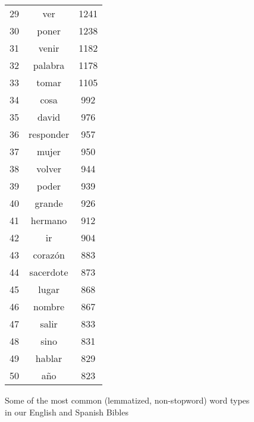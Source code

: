 \begin{figure*}
\begin{tiny}
\begin{centering}
\begin{tabular}{|r|c|c|}
29 & ver & 1241 \\
30 & poner & 1238 \\
31 & venir & 1182 \\
32 & palabra & 1178 \\
33 & tomar & 1105 \\
34 & cosa & 992 \\
35 & david & 976 \\
36 & responder & 957 \\
37 & mujer & 950 \\
38 & volver & 944 \\
39 & poder & 939 \\
40 & grande & 926 \\
41 & hermano & 912 \\
42 & ir & 904 \\
43 & corazón & 883 \\
44 & sacerdote & 873 \\
45 & lugar & 868 \\
46 & nombre & 867 \\
47 & salir & 833 \\
48 & sino & 831 \\
49 & hablar & 829 \\
50 & año & 823 \\
    \hline
  \end{tabular}
  \end{centering}
  \end{tiny}
  \caption{Some of the most common (lemmatized, non-stopword) word types in our
  English and Spanish Bibles}
  \label{fig:mostcommon-en-es}
\end{figure*}

